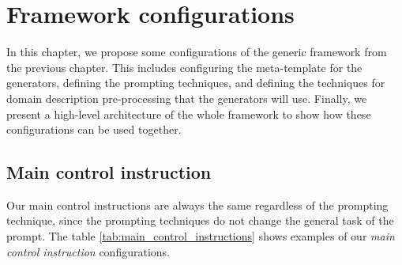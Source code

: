 \chapter{Framework configurations}
\label{chap:framework_configuration}

In this chapter, we propose some configurations of the generic framework from the previous chapter. This includes configuring the meta-template for the generators, defining the prompting techniques, and defining the techniques for domain description pre-processing that the generators will use. Finally, we present a high-level architecture of the whole framework to show how these configurations can be used together.


\section{Main control instruction}

Our main control instructions are always the same regardless of the prompting technique, since the prompting techniques do not change the general task of the prompt. The table \ref{tab:main_control_instructions} shows examples of our \emph{main control instruction} configurations.


